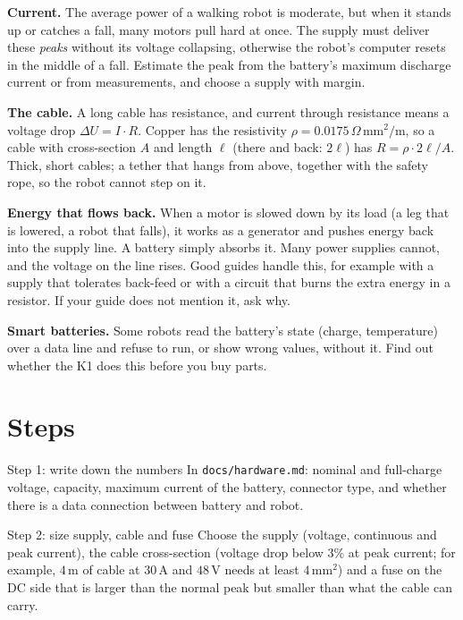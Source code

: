 \textbf{Current.} The average power of a walking robot is moderate, but when it stands up or catches a fall, many motors pull hard at once. The supply must deliver these \emph{peaks} without its voltage collapsing, otherwise the robot's computer resets in the middle of a fall. Estimate the peak from the battery's maximum discharge current or from measurements, and choose a supply with margin.

\textbf{The cable.} A long cable has resistance, and current through resistance means a voltage drop $\Delta U=I\cdot R$. Copper has the resistivity $\rho=0.0175\,\Omega\,\text{mm}^2/\text{m}$, so a cable with cross-section $A$ and length $\ell$ (there and back: $2\ell$) has $R=\rho\cdot2\ell/A$. Thick, short cables; a tether that hangs from above, together with the safety rope, so the robot cannot step on it.

\textbf{Energy that flows back.} When a motor is slowed down by its load (a leg that is lowered, a robot that falls), it works as a generator and pushes energy back into the supply line. A battery simply absorbs it. Many power supplies cannot, and the voltage on the line rises. Good guides handle this, for example with a supply that tolerates back-feed or with a circuit that burns the extra energy in a resistor. If your guide does not mention it, ask why.

\textbf{Smart batteries.} Some robots read the battery's state (charge, temperature) over a data line and refuse to run, or show wrong values, without it\guess. Find out whether the K1 does this before you buy parts.

\section*{Steps}
\begin{stepbox}{Step 1: write down the numbers}
In \texttt{docs/hardware.md}: nominal and full-charge voltage, capacity, maximum current of the battery, connector type, and whether there is a data connection between battery and robot.
\end{stepbox}

\begin{stepbox}{Step 2: size supply, cable and fuse}
Choose the supply (voltage, continuous and peak current), the cable cross-section (voltage drop below $3\%$ at peak current; for example, $4$\,m of cable at $30$\,A and $48$\,V needs at least $4$\,mm$^2$) and a fuse on the DC side that is larger than the normal peak but smaller than what the cable can carry.
\end{stepbox}

